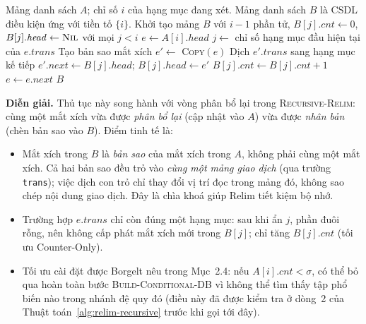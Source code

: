 \documentclass[12pt,a4paper]{report}
\begin{document}
\begin{algorithm}[H]
\caption{\textsc{Build-Conditional-DB}: dựng CSDL điều kiện cho hạng mục $i$}
\label{alg:relim-build-cond}
\begin{algorithmic}[1]
\REQUIRE Mảng danh sách $A$; chỉ số $i$ của hạng mục đang xét.
\ENSURE Mảng danh sách $B$ là CSDL điều kiện ứng với tiền tố $\{i\}$.
\STATE Khởi tạo mảng $B$ với $i-1$ phần tử,
       $B[j].\mathit{cnt} \leftarrow 0$,
       $B[j].\mathit{head} \leftarrow \textsc{Nil}$ với mọi $j < i$
\STATE $e \leftarrow A[i].\mathit{head}$
        \STATE $j \leftarrow$ chỉ số hạng mục đầu hiện tại của $e.\mathit{trans}$
        \STATE Tạo bản sao mắt xích $e' \leftarrow$ \textsc{Copy}$(e)$
        \STATE Dịch $e'.\mathit{trans}$ sang hạng mục kế tiếp 
            \STATE $e'.\mathit{next} \leftarrow B[j].\mathit{head}$;
                   $B[j].\mathit{head} \leftarrow e'$
        \ENDIF
        \STATE $B[j].\mathit{cnt} \leftarrow B[j].\mathit{cnt} + 1$
    \ENDIF
    \STATE $e \leftarrow e.\mathit{next}$
\ENDWHILE
\RETURN $B$
\end{algorithmic}
\end{algorithm}

\noindent
\textbf{Diễn giải.} Thủ tục này song hành với vòng phân bổ lại trong
\textsc{Recursive-Relim}: cùng một mắt xích vừa được \textit{phân bổ lại} (cập
nhật vào $A$) vừa được \textit{nhân bản} (chèn bản sao vào $B$). Điểm tinh tế
là:
\begin{itemize}
    \item Mắt xích trong $B$ là \textit{bản sao} của mắt xích trong $A$, không
    phải cùng một mắt xích. Cả hai bản sao đều trỏ vào \textit{cùng một mảng
    giao dịch} (qua trường \texttt{trans}); việc dịch con trỏ chỉ thay đổi vị
    trí đọc trong mảng đó, không sao chép nội dung giao dịch. Đây là chìa khoá
    giúp Relim tiết kiệm bộ nhớ.
    \item Trường hợp $e.\mathit{trans}$ chỉ còn đúng một hạng mục: sau khi ẩn
    $j$, phần đuôi rỗng, nên không cấp phát mắt xích mới trong $B[j]$; chỉ tăng
    $B[j].\mathit{cnt}$ (tối ưu Counter-Only).
    \item Tối ưu cài đặt được Borgelt nêu trong Mục~2.4: nếu
    $A[i].\mathit{cnt} < \sigma$, có thể bỏ qua hoàn toàn bước
    \textsc{Build-Conditional-DB} vì không thể tìm thấy tập phổ biến nào trong
    nhánh đệ quy đó (điều này đã được kiểm tra ở dòng~2 của
    Thuật toán~\ref{alg:relim-recursive} trước khi gọi tới đây).
\end{itemize}
\end{document}
